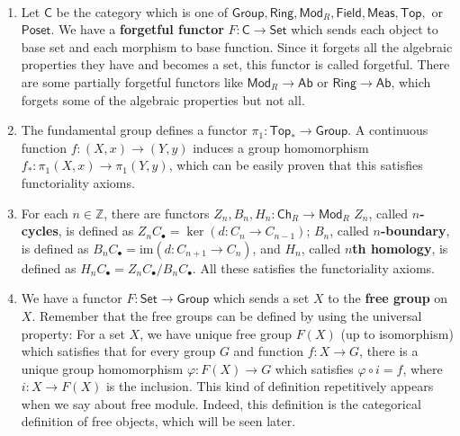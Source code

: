 \begin{exmp} 
~\begin{enumerate}
\item Let $\mathsf{C}$ be the category which is one of $\mathsf{Group}, \mathsf{Ring}, \mathsf{Mod}_R, \mathsf{Field}, \mathsf{Meas}, \mathsf{Top},$ or $\mathsf{Poset}$. We have a \textbf{forgetful functor} $F:\mathsf{C}\rightarrow\mathsf{Set}$ which sends each object to base set and each morphism to base function. Since it forgets all the algebraic properties they have and becomes a set, this functor is called forgetful. There are some partially forgetful functors like $\mathsf{Mod}_R\rightarrow \mathsf{Ab}$ or $\mathsf{Ring}\rightarrow \mathsf{Ab}$, which forgets some of the algebraic properties but not all.
\item The fundamental group defines a functor $\pi_1:\mathsf{Top}_*\rightarrow\mathsf{Group}$. A continuous function $f:(X,x)\rightarrow (Y,y)$ induces a group homomorphism $f_*:\pi_1(X,x)\rightarrow \pi_1(Y,y)$, which can be easily proven that this satisfies functoriality axioms.
\item For each $n\in \mathbb{Z}$, there are functors $Z_n, B_n, H_n:\mathsf{Ch}_R\rightarrow \mathsf{Mod}_R$ $Z_n$, called \textbf{$n$-cycles}, is defined as $Z_n C_{\bullet}=\ker(d:C_n\rightarrow C_{n-1})$; $B_n$, called \textbf{$n$-boundary}, is defined as $B_n C_{\bullet}=\mathrm{im}(d:C_{n+1}\rightarrow C_n)$, and $H_n$, called \textbf{$n$th homology}, is defined as $H_n C_{\bullet}=Z_n C_{\bullet}/B_n C_{\bullet}$. All these satisfies the functoriality axioms.
\item We have a functor $F:\mathsf{Set}\rightarrow \mathsf{Group}$ which sends a set $X$ to the \textbf{free group} on $X$. Remember that the free groups can be defined by using the universal property: For a set $X$, we have unique free group $F(X)$ (up to isomorphism) which satisfies that for every group $G$ and function $f:X\rightarrow G$, there is a unique group homomorphism $\varphi:F(X)\rightarrow G$ which satisfies $\varphi \circ i=f$, where $i:X\rightarrow F(X)$ is the inclusion. This kind of definition repetitively appears when we say about free module. Indeed, this definition is the categorical definition of free objects, which will be seen later.
\end{enumerate}
\end{exmp}

